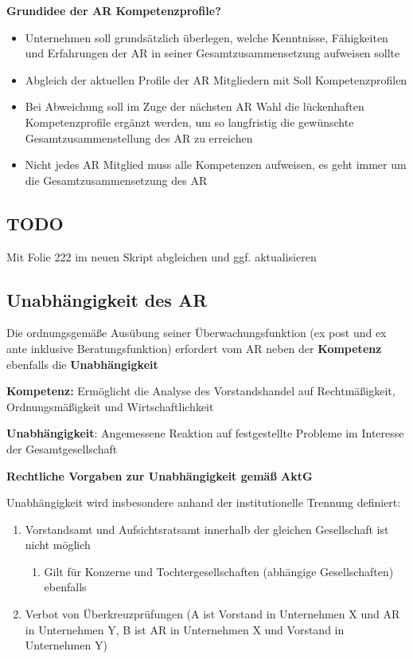 \documentclass[
]{article}
\providecommand{\tightlist}{%
  \setlength{\itemsep}{0pt}\setlength{\parskip}{0pt}}
\begin{document}
\textbf{Grundidee der AR Kompetenzprofile?}

\begin{itemize}
\tightlist
\item
  Unternehmen soll grundsätzlich überlegen, welche Kenntnisse,
  Fähigkeiten und Erfahrungen der AR in seiner Gesamtzusammensetzung
  aufweisen sollte
\item
  Abgleich der aktuellen Profile der AR Mitgliedern mit Soll
  Kompetenzprofilen
\item
  Bei Abweichung soll im Zuge der nächsten AR Wahl die lückenhaften
  Kompetenzprofile ergänzt werden, um so langfristig die gewünschte
  Gesamtzusammenstellung des AR zu erreichen
\item
  Nicht jedes AR Mitglied muss alle Kompetenzen aufweisen, es geht immer
  um die Gesamtzusammensetzung des AR
\end{itemize}

\hypertarget{todo}{%
\subsection{TODO}\label{todo}}

Mit Folie 222 im neuen Skript abgleichen und ggf. aktualisieren

\hypertarget{unabhuxe4ngigkeit-des-ar}{%
\subsection{Unabhängigkeit des AR}\label{unabhuxe4ngigkeit-des-ar}}

Die ordnungsgemäße Ausübung seiner Überwachungsfunktion (ex post und ex
ante inklusive Beratungsfunktion) erfordert vom AR neben der
\textbf{Kompetenz} ebenfalls die \textbf{Unabhängigkeit}

\textbf{Kompetenz: }Ermöglicht die Analyse des Vorstandshandel auf
Rechtmäßigkeit, Ordnungsmäßigkeit und Wirtschaftlichkeit

\textbf{Unabhängigkeit}: Angemessene Reaktion auf festgestellte Probleme
im Interesse der Gesamtgesellschaft

\textbf{Rechtliche Vorgaben zur Unabhängigkeit gemäß AktG}

Unabhängigkeit wird insbesondere anhand der institutionelle Trennung
definiert:

\begin{enumerate}
\def\labelenumi{\arabic{enumi}.}
\item
  Vorstandsamt und Aufsichtsratsamt innerhalb der gleichen Gesellschaft
  ist nicht möglich

  \begin{enumerate}
  \def\labelenumii{\alph{enumii}.}
  \tightlist
  \item
    Gilt für Konzerne und Tochtergesellschaften (abhängige
    Gesellschaften) ebenfalls
  \end{enumerate}
\item
  Verbot von Überkreuzprüfungen (A ist Vorstand in Unternehmen X und AR
  in Unternehmen Y, B ist AR in Unternehmen X und Vorstand in
  Unternehmen Y)
\end{enumerate}
\end{document}
